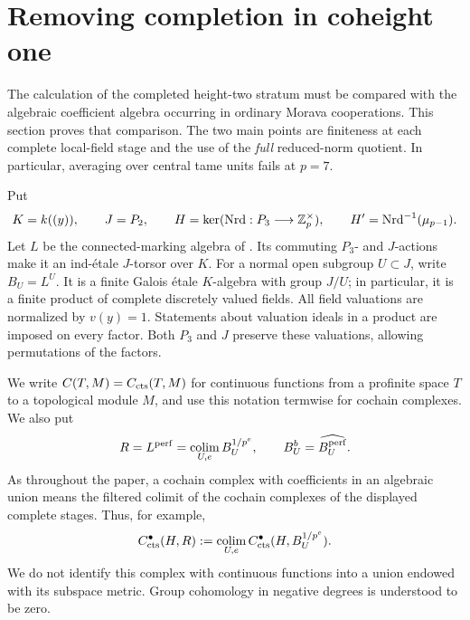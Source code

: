 \section{Removing completion in coheight one}\label{h3:sec:coheight-one}

The calculation of the completed height-two stratum must be compared with
the algebraic coefficient algebra occurring in ordinary Morava cooperations.
This section proves that comparison.  The two main points are finiteness at
each complete local-field stage and the use of the \emph{full} reduced-norm
quotient.  In particular, averaging over central tame units fails at
$p=7$.

Put
\[
 K=k((y)),\qquad J=P_2,\qquad
 H=\ker(\operatorname{Nrd}:P_3\longrightarrow\mathbb Z_p^\times),\qquad
 H'=\operatorname{Nrd}^{-1}(\mu_{p-1}).
\]
Let $L$ be the connected-marking algebra of
.  Its commuting $P_3$- and
$J$-actions make it an ind-\'etale $J$-torsor over $K$.
For a normal open subgroup $U\subset J$, write $B_U=L^U$.
It is a finite Galois \'etale $K$-algebra with group $J/U$; in particular,
it is a finite product of complete discretely valued fields.  All field
valuations are normalized by $v(y)=1$.  Statements about valuation ideals
in a product are imposed on every factor.  Both $P_3$ and $J$ preserve
these valuations, allowing permutations of the factors.

We write $C(T,M)=C_{\mathrm{cts}}(T,M)$ for continuous functions from a
profinite space $T$ to a topological module $M$, and use this notation
termwise for cochain complexes. We also put
\[
 R=L^{\mathrm{perf}}=\operatorname*{colim}_{U,e}B_U^{1/p^e},\qquad
 B_U^b=\widehat{B_U^{\mathrm{perf}}}.
\]
As throughout the paper, a cochain complex with coefficients in an
algebraic union means the filtered colimit of the cochain complexes of
the displayed complete stages.  Thus, for example,
\begin{equation}\label{h3:co:filtered-convention}
 C^\bullet_{\mathrm{cts}}(H,R)
 :=\operatorname*{colim}_{U,e}C^\bullet_{\mathrm{cts}}(H,B_U^{1/p^e}).
\end{equation}
We do not identify this complex with continuous functions into a union
endowed with its subspace metric.  Group cohomology in negative degrees
is understood to be zero.

